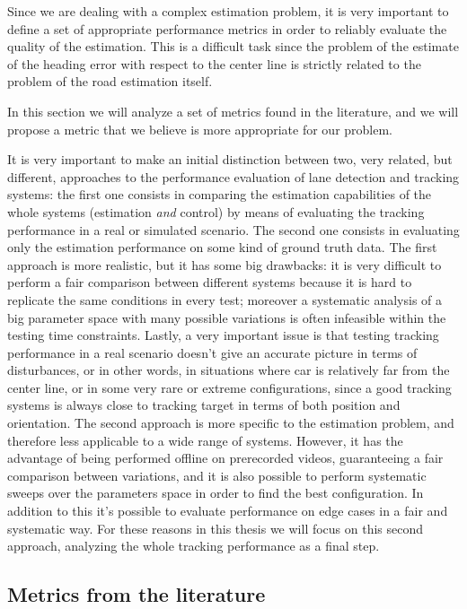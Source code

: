 \documentclass[a4paper,12pt,sort&compress]{article}
\begin{document}
    Since we are dealing with a complex estimation problem, it is very important to define a set of
    appropriate performance metrics in order to reliably evaluate the quality of the estimation.
    This is a difficult task since the problem of the estimate of the heading error with respect to
    the center line is strictly related to the problem of the road estimation itself. 

    In this section we will analyze a set of metrics found in the literature, and we will propose a
    metric that we believe is more appropriate for our problem. 

    It is very important to make an initial distinction between two, very related, but
    different, approaches to the performance evaluation of lane detection and tracking systems: the
    first one consists in comparing the estimation capabilities of the whole systems (estimation
    \textit{and} control) by means of evaluating the tracking performance in a real or simulated
    scenario. The second one consists in evaluating only the estimation performance on some kind of
    ground truth data. The first approach is more realistic, but it has some big drawbacks: it is
    very difficult to perform a fair comparison between different systems because it is hard to
    replicate the same conditions in every test; moreover a systematic analysis of a big parameter
    space with many possible variations is often infeasible within the testing time constraints.
    Lastly, a very important issue is that testing tracking performance in a real scenario doesn't
    give an accurate picture in terms of disturbances, or in other words, in situations where car is
    relatively far from the center line, or in some very rare or extreme configurations, since a
    good tracking systems is always close to tracking target in terms of both position and orientation. 
    The second approach is more specific to the estimation problem, and therefore less applicable to
    a wide range of systems. However, it has the advantage of being performed offline on prerecorded
    videos, guaranteeing a fair comparison between variations, and it is also possible to perform
    systematic sweeps over the parameters space in order to find the best configuration. In addition
    to this it's possible to evaluate performance on edge cases in a fair and systematic way.  For these
    reasons in this thesis we will focus on this second approach, analyzing the whole tracking
    performance as a final step.

    \subsection{Metrics from the literature}
\end{document}
